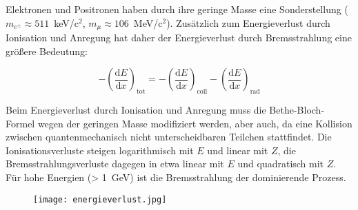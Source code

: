 \FloatBarrier
Elektronen und Positronen haben durch ihre geringe Masse eine Sonderstellung
($m_{e^{\pm}} \approx 511$~keV/c$^2$, $m_{\mu} \approx 106$~MeV/c$^2$). Zusätzlich zum Energieverlust durch Ionisation und
Anregung hat daher der Energieverlust durch Bremsstrahlung eine größere Bedeutung:

\[-\left(\frac{\mathrm{d}E}{\mathrm{d}x}\right)_{\text{tot}} = -\left(\frac{\mathrm{d}E}{\mathrm{d}x}\right)_{\text{coll}}
-\left(\frac{\mathrm{d}E}{\mathrm{d}x}\right)_{\text{rad}} \]

Beim Energieverlust durch Ionisation und Anregung muss die Bethe-Bloch-Formel wegen der geringen
Masse modifiziert werden, aber auch, da eine Kollision zwischen quantenmechanisch nicht
unterscheidbaren Teilchen stattfindet. Die Ionisationsverluste steigen logarithmisch mit $E$ und
linear mit $Z$, die Bremsstrahlungsverluste dagegen in etwa linear mit $E$ und quadratisch mit $Z$.
Für hohe Energien (> 1~GeV) ist die Bremsstrahlung der dominierende Prozess.

\begin{figure}
	\centering
	\texttt{[image: energieverlust.jpg]}
\end{figure}


\FloatBarrier